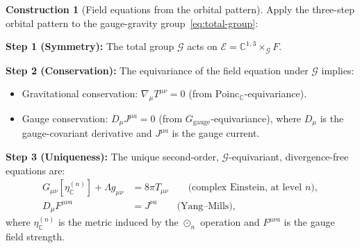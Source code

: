 \documentclass[12pt]{article}
\theoremstyle{plain}
\theoremstyle{definition}
\newtheorem{construction}[theorem]{Construction}
\theoremstyle{remark}
\newcommand{\Poinc}{\mathrm{Poinc}}
\newcommand{\CC}{\mathbb{C}}
\begin{document}
\begin{construction}[Field equations from the orbital pattern]\label{constr:eym}
Apply the three-step orbital pattern to the gauge-gravity group~\eqref{eq:total-group}:

\textbf{Step 1 (Symmetry):} The total group $\mathcal{G}$ acts on $\mathcal{E} = \CC^{1,3} \times_\mathcal{G} F$.

\textbf{Step 2 (Conservation):} The equivariance of the field equation under $\mathcal{G}$ implies:
\begin{itemize}
    \item Gravitational conservation: $\nabla_\mu T^{\mu\nu} = 0$ (from $\Poinc_\CC$-equivariance).
    \item Gauge conservation: $D_\mu J^{\mu a} = 0$ (from $G_{\mathrm{gauge}}$-equivariance), where $D_\mu$ is the gauge-covariant derivative and $J^{\mu a}$ is the gauge current.
\end{itemize}

\textbf{Step 3 (Uniqueness):} The unique second-order, $\mathcal{G}$-equivariant, divergence-free equations are:
\begin{align}
G_{\mu\nu}[\eta_\CC^{(n)}] + \Lambda g_{\mu\nu} &= 8\pi T_{\mu\nu} \qquad\text{(complex Einstein, at level $n$)}, \label{eq:complex-einstein} \\
D_\mu F^{\mu\nu a} &= J^{\nu a} \qquad\text{(Yang--Mills)}, \label{eq:ym}
\end{align}
where $\eta_\CC^{(n)}$ is the metric induced by the $\odot_n$ operation and $F^{\mu\nu a}$ is the gauge field strength.
\end{construction}
\end{document}
